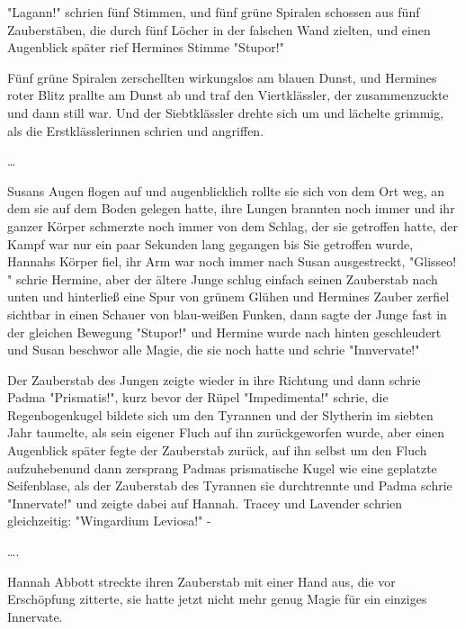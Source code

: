 {"Lagann!" schrien fünf Stimmen, und fünf grüne Spiralen schossen aus fünf Zauberstäben, die durch fünf Löcher in der falschen Wand zielten, und einen Augenblick später rief Hermines Stimme "Stupor!"

Fünf grüne Spiralen zerschellten wirkungslos am blauen Dunst, und Hermines roter Blitz prallte am Dunst ab und traf den Viertklässler, der zusammenzuckte und dann still war. Und der Siebtklässler drehte sich um und lächelte grimmig, als die Erstklässlerinnen schrien und angriffen.

…

Susans Augen flogen auf und augenblicklich rollte sie sich von dem Ort weg, an dem sie auf dem Boden gelegen hatte, ihre Lungen brannten noch immer und ihr ganzer Körper schmerzte noch immer von dem Schlag, der sie getroffen hatte, der Kampf war nur ein paar Sekunden lang gegangen bis Sie getroffen wurde, Hannahs Körper fiel, ihr Arm war noch immer nach Susan ausgestreckt, "Glisseo! " schrie Hermine, aber der ältere Junge schlug einfach seinen Zauberstab nach unten und hinterließ eine Spur von grünem Glühen und Hermines Zauber zerfiel sichtbar in einen Schauer von blau-weißen Funken, dann sagte der Junge fast in der gleichen Bewegung "Stupor!" und Hermine wurde nach hinten geschleudert und Susan beschwor alle Magie, die sie noch hatte und schrie "Innvervate!"

Der Zauberstab des Jungen zeigte wieder in ihre Richtung und dann schrie Padma "Prismatis!", kurz bevor der Rüpel "Impedimenta!" schrie, die Regenbogenkugel bildete sich um den Tyrannen und der Slytherin im siebten Jahr taumelte, als sein eigener Fluch auf ihn zurückgeworfen wurde, aber einen Augenblick später fegte der Zauberstab zurück, auf ihn selbst um den Fluch aufzuhebenund dann zersprang Padmas prismatische Kugel wie eine geplatzte Seifenblase, als der Zauberstab des Tyrannen sie durchtrennte und Padma schrie "Innervate!" und zeigte dabei auf Hannah. Tracey und Lavender schrien gleichzeitig: "Wingardium Leviosa!" -

….

Hannah Abbott streckte ihren Zauberstab mit einer Hand aus, die vor Erschöpfung zitterte, sie hatte jetzt nicht mehr genug Magie für ein einziges Innervate.

}
